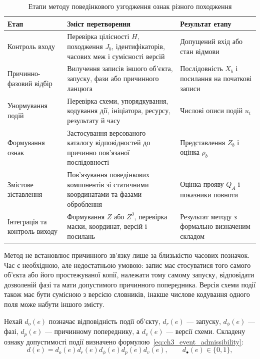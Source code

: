 \begin{table}[htbp]
\centering
\small
\caption{Етапи методу поведінкового узгодження ознак різного походження}
\label{tab:ch3_behavior_stages}
\begin{tabularx}{\textwidth}{@{}>{\raggedright\arraybackslash}p{}Y>{\raggedright\arraybackslash}p{0.24\textwidth}@{}}
\toprule
Етап & Зміст перетворення & Результат етапу \\
\midrule
Контроль входу & Перевірка цілісності $H$, походження $J_b$, ідентифікаторів, часових меж і сумісності версій & Допущений вхід або стан відмови \\
Причинно-фазовий відбір & Вилучення записів іншого об’єкта, запуску, фази або причинного ланцюга & Послідовність $X_b$ і посилання на початкові записи \\
Унормування подій & Перевірка схеми, упорядкування, кодування дії, ініціатора, ресурсу, результату й часу & Числові описи подій $u_t$ \\
Формування ознак & Застосування версованого каталогу відповідностей до причинно пов’язаної послідовності & Представлення $Z_b$ і оцінка $\rho_b$ \\
Змістове зіставлення & Пов’язування поведінкових компонентів зі статичними координатами та фазами оброблення & Оцінка прояву $Q_A$ і показники повноти \\
Інтеграція та контроль виходу & Формування $Z$ або $Z^{\partial}$, перевірка маски, координат, версій і посилань & Результат методу з формально визначеним складом \\
\bottomrule
\end{tabularx}
\end{table}

Метод не встановлює причинного зв’язку лише за близькістю часових позначок. Час є необхідною, але недостатньою умовою: запис має стосуватися того самого об’єкта або його простежуваної копії, належати тому самому запуску, відповідати дозволеній фазі та мати допустимого причинного попередника. Версія схеми події також має бути сумісною з версією словників, інакше числове кодування одного поля може набути іншого змісту.

Нехай $d_o(e)$ позначає відповідність події об’єкту, $d_r(e)$ --- запуску, $d_{\phi}(e)$ --- фазі, $d_p(e)$ --- причинному попереднику, а $d_v(e)$ --- версії схеми. Складену ознаку допустимості події визначено формулою~\eqref{eq:ch3_event_admissibility}:
\begin{equation}
d(e)=d_o(e)d_r(e)d_{\phi}(e)d_p(e)d_v(e),\qquad d_{\bullet}(e)\in\{0,1\},
\label{eq:ch3_event_admissibility}
\end{equation}

